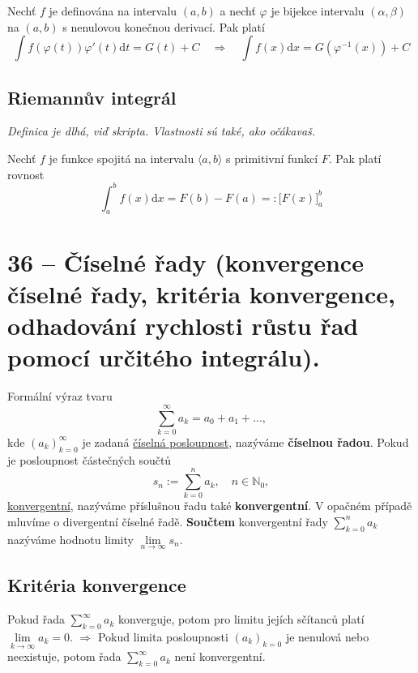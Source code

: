 \theorem [Substituce II] Nechť $f$ je definována na intervalu $(a, b)$ a nechť $\varphi$ je bijekce intervalu $(\alpha, \beta)$ na $(a, b)$ s nenulovou konečnou derivací. Pak platí
$$
	\int f(\varphi(t))\varphi'(t)\mathrm{d}t=G(t)+C \quad\Rightarrow\quad \int f(x)\mathrm{d}x=G(\varphi^{-1}(x))+C
$$

\subsection{Riemannův integrál}
\textit{Definica je dlhá, viď skripta. Vlastnosti sú také, ako očákavaš.}

 Nechť $f$ je funkce spojitá na intervalu $\langle a,b\rangle$ s primitivní funkcí $F$. Pak platí rovnost
$$
	\int_a^b f(x)\mathrm{d}x = F(b) - F(a) =: \big[ F(x) \big]_a^b
$$

\section{36 -- Číselné řady (konvergence číselné řady, kritéria konvergence, odhadování rychlosti růstu řad pomocí určitého integrálu).}

\label{def:rada} Formální výraz tvaru
$$
	\sum_{k=0}^{\infty}a_k=a_0+a_1+\dots,
$$
kde $(a_k)_{k=0}^{\infty}$ je zadaná \hyperref[def:posloupnost]{číselná posloupnost}, nazýváme \textbf{číselnou řadou}. Pokud je posloupnost částečných součtů
$$
	s_n:=\sum_{k=0}^n a_k,\quad n\in\mathbb{N}_0,
$$
\hyperref[def:konvergence]{konvergentní}, nazýváme příslušnou řadu také \textbf{konvergentní}. V opačném případě mluvíme o divergentní číselné řadě. \textbf{Součtem} konvergentní řady $\sum_{k=0}^n a_k$ nazýváme hodnotu limity $\lim\limits_{n\rightarrow\infty} s_n$.

\subsection{Kritéria konvergence}

\label{th:nutna_konvergence} Pokud řada $\sum_{k=0}^{\infty}a_k$ konverguje, potom pro limitu jejích sčítanců platí $\lim\limits_{k\rightarrow\infty} a_k = 0$. \hspace{.5cm}$\Rightarrow$\hspace{.5cm} Pokud limita posloupnosti $(a_k)_{k=0}$ je nenulová nebo neexistuje, potom řada $\sum_{k=0}^{\infty} a_k$ není konvergentní.

